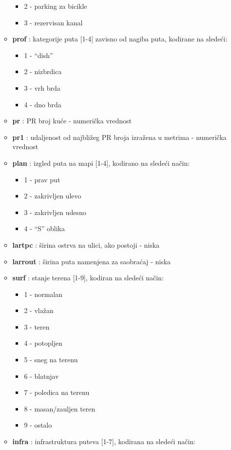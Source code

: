 \documentclass[a4paper,10pt]{article}
\begin{document}
\begin{itemize}
\begin{itemize}
\begin{itemize}
	 \item 2 - parking za bicikle
	 \item 3 - rezervisan kanal
	\end{itemize}
  \item \textbf{prof} : kategorije puta [1-4] zavisno od nagiba puta, kodirane na sledeći:
	\begin{itemize}
	 \item 1 - ``dish''
	 \item 2 - nizbrdica
	 \item 3 - vrh brda
	 \item 4 - dno brda
	\end{itemize}
  \item \textbf{pr} : PR broj kuće - numerička vrednost
  \item \textbf{pr1} : udaljenost od najbližeg PR broja izražena u metrima - numerička vrednost
  \item \textbf{plan} : izgled puta na mapi [1-4], kodirano na sledeći način:
	\begin{itemize}
	 \item 1 - prav put
	 \item 2 - zakrivljen ulevo
	 \item 3 - zakrivljen udesno
	 \item 4 - ``S'' oblika
	\end{itemize}
  \item \textbf{lartpc} : širina ostrva na ulici, ako postoji - niska
  \item \textbf{larrout} : širina puta namenjena za saobraćaj - niska
  \item \textbf{surf} : stanje terena [1-9], kodiran na sledeći način:
	\begin{itemize}
	 \item 1 - normalan
	 \item 2 - vlažan
	 \item 3 - teren
	 \item 4 - potopljen
	 \item 5 - sneg na terenu
	 \item 6 - blatnjav
	 \item 7 - poledica na terenu
	 \item 8 - masan/zauljen teren
	 \item 9 - ostalo
	\end{itemize}
  \item \textbf{infra} : infrastruktura puteva [1-7], kodirana na sledeći način:
	\begin{itemize}

\end{itemize}
\end{itemize}
\end{itemize}
\end{document}
